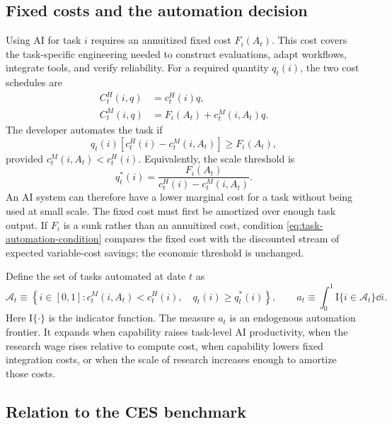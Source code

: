 \subsection{Fixed costs and the automation decision}

Using AI for task $i$ requires an annuitized fixed cost $F_i(A_t)$. This cost covers
the task-specific engineering needed to construct evaluations, adapt workflows,
integrate tools, and verify reliability. For a required quantity $q_t(i)$, the two
cost schedules are
\begin{align}
    C^H_t(i,q)&=c^H_t(i)q,
    \label{eq:human-task-total-cost}\\
    C^M_t(i,q)&=F_i(A_t)+c^M_t(i,A_t)q.
    \label{eq:machine-task-total-cost}
\end{align}
The developer automates the task if
\begin{equation}
    q_t(i)\left[c^H_t(i)-c^M_t(i,A_t)\right]
    \geq F_i(A_t),
    \label{eq:task-automation-condition}
\end{equation}
provided $c^M_t(i,A_t)<c^H_t(i)$. Equivalently, the scale threshold is
\begin{equation}
    q^*_t(i)
    =
    \frac{F_i(A_t)}
    {c^H_t(i)-c^M_t(i,A_t)}.
    \label{eq:task-scale-threshold}
\end{equation}
An AI system can therefore have a lower marginal cost for a task without being used
at small scale. The fixed cost must first be amortized over enough task output. If
$F_i$ is a sunk rather than an annuitized cost, condition
\eqref{eq:task-automation-condition} compares the fixed cost with the discounted
stream of expected variable-cost savings; the economic threshold is unchanged.

Define the set of tasks automated at date $t$ as
\begin{equation}
    \mathcal A_t
    \equiv
    \left\{
        i\in[0,1]:
        c^M_t(i,A_t)<c^H_t(i),\quad
        q_t(i)\geq q^*_t(i)
    \right\},
    \qquad
    a_t\equiv\int_0^1\mathrm{I}\{i\in\mathcal A_t\}\dd i.
    \label{eq:automated-task-set}
\end{equation}
Here $\mathrm{I}\{\cdot\}$ is the indicator function. The measure $a_t$ is an
endogenous automation frontier. It expands when capability
raises task-level AI productivity, when the research wage rises relative to compute
cost, when capability lowers fixed integration costs, or when the scale of research
increases enough to amortize those costs.

\subsection{Relation to the CES benchmark}

